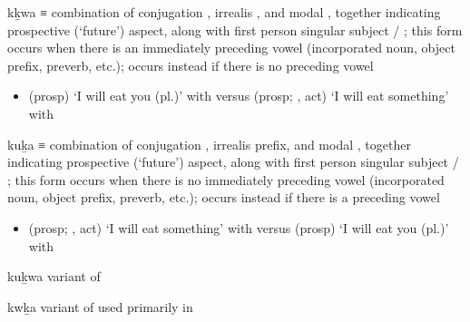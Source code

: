 \begin{morphdesc}[resume*=alphalist]
\item[kḵwa]
	≡ 
	combination of conjugation ,
		irrealis ,
		and modal ,
			together indicating prospective (‘future’) aspect,
		along with first person singular subject  / ;
	this form occurs when there is an
		immediately preceding vowel (incorporated noun, object prefix, preverb, etc.);
	 occurs instead if there is no preceding vowel
	\begin{itemize}
	\item	{} (prosp) ‘I will eat you (pl.)’
			with \newline
		versus  (prosp; ,  act) ‘I will eat something’
			with 
	\end{itemize}

\item[kuḵa]
	≡ 
	combination of conjugation ,
		irrealis  prefix,
		and modal ,
			together indicating prospective (‘future’) aspect,
		along with first person singular subject  / ;
	this form occurs when there is no
		immediately preceding vowel (incorporated noun, object prefix, preverb, etc.);
	 occurs instead if there is a preceding vowel
	\begin{itemize}
	\item	{} (prosp; ,  act) ‘I will eat something’
			with \newline
		versus  (prosp) ‘I will eat you (pl.)’
			with 
	\end{itemize}

\item[kuḵwa]
	variant of 
	
\item[kwḵa]
	variant of  used primarily in \cite{story-naish:1973}
\end{morphdesc}


